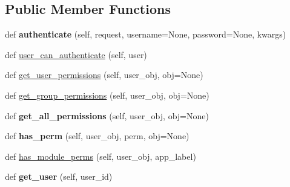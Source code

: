 \subsection*{Public Member Functions}
\begin{DoxyCompactItemize}
\item 
\mbox{\label{classdjango_1_1contrib_1_1auth_1_1backends_1_1_model_backend_a9a436af1d98f661bb94c1590c6450f89}} 
def {\bfseries authenticate} (self, request, username=None, password=None, kwargs)
\item 
def \mbox{\hyperlink{classdjango_1_1contrib_1_1auth_1_1backends_1_1_model_backend_a975db86c12c2ffcdb467340075f1a540}{user\+\_\+can\+\_\+authenticate}} (self, user)
\item 
def \mbox{\hyperlink{classdjango_1_1contrib_1_1auth_1_1backends_1_1_model_backend_a4fd27154416352bef1edfc9e168d3fd7}{get\+\_\+user\+\_\+permissions}} (self, user\+\_\+obj, obj=None)
\item 
def \mbox{\hyperlink{classdjango_1_1contrib_1_1auth_1_1backends_1_1_model_backend_aaa64689bb804ed118d4a4a84971ca62a}{get\+\_\+group\+\_\+permissions}} (self, user\+\_\+obj, obj=None)
\item 
\mbox{\label{classdjango_1_1contrib_1_1auth_1_1backends_1_1_model_backend_ab528a241dbfb23eaadfda42fb5883b12}} 
def {\bfseries get\+\_\+all\+\_\+permissions} (self, user\+\_\+obj, obj=None)
\item 
\mbox{\label{classdjango_1_1contrib_1_1auth_1_1backends_1_1_model_backend_aee2d53612dc1a5ce0307eca7b574e590}} 
def {\bfseries has\+\_\+perm} (self, user\+\_\+obj, perm, obj=None)
\item 
def \mbox{\hyperlink{classdjango_1_1contrib_1_1auth_1_1backends_1_1_model_backend_a5471478f39db4cfd655dd3d484c489f1}{has\+\_\+module\+\_\+perms}} (self, user\+\_\+obj, app\+\_\+label)
\item 
\mbox{\label{classdjango_1_1contrib_1_1auth_1_1backends_1_1_model_backend_a50eb49cd147b266ac55c9516b71219c9}} 
def {\bfseries get\+\_\+user} (self, user\+\_\+id)
\end{DoxyCompactItemize}


